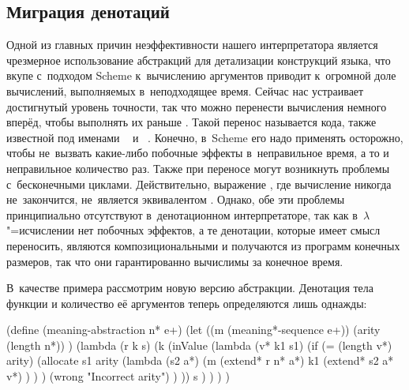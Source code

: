 \subsection{Миграция денотаций}\label{fast/fast/ssect:migration}

Одной из главных причин неэффективности нашего интерпретатора является
чрезмерное использование абстракций для детализации конструкций языка, что вкупе
с~подходом Scheme к~вычислению аргументов приводит к~огромной доле вычислений,
выполняемых в~неподходящее время. Сейчас нас устраивает достигнутый уровень
точности, так что можно перенести вычисления немного вперёд, чтобы выполнять их
раньше \cite{deu89}. Такой перенос называется  кода, также
известной под именами ~\cite{tak88} и
~\cite{roz92}. Конечно, в~Scheme его надо применять
осторожно, чтобы не~вызвать какие-либо побочные эффекты в~неправильное время, а
то и неправильное количество раз. Также при переносе могут возникнуть проблемы
с~бесконечными циклами. Действительно, выражение , где вычисление \ic{($\omega$~$\omega$)} никогда
не~закончится, не~является эквивалентом . Однако, обе эти проблемы принципиально отсутствуют
в~денотационном интерпретаторе, так как в~$\lambda$"=исчислении нет побочных
эффектов, а те денотации, которые имеет смысл переносить, являются
композициональными и получаются из программ конечных размеров, так что они
гарантированно вычислимы за конечное время.

В~качестве примера рассмотрим новую версию абстракции. Денотация тела функции
 и количество её аргументов  теперь
определяются лишь однажды:

\begin{code:lisp}
(define (meaning-abstraction n* e+)
  (let ((m (meaning*-sequence e+))
        (arity (length n*)) )
    (lambda (r k s)
      (k (inValue (lambda (v* k1 s1)
                    (if (= (length v*) arity)
                        (allocate s1 arity
                                  (lambda (s2 a*)
                                    (m (extend* r n* a*)
                                       k1
                                       (extend* s2 a* v*) ) ) )
                        (wrong "Incorrect arity") ) ))
         s ) ) ) )
\end{code:lisp}


